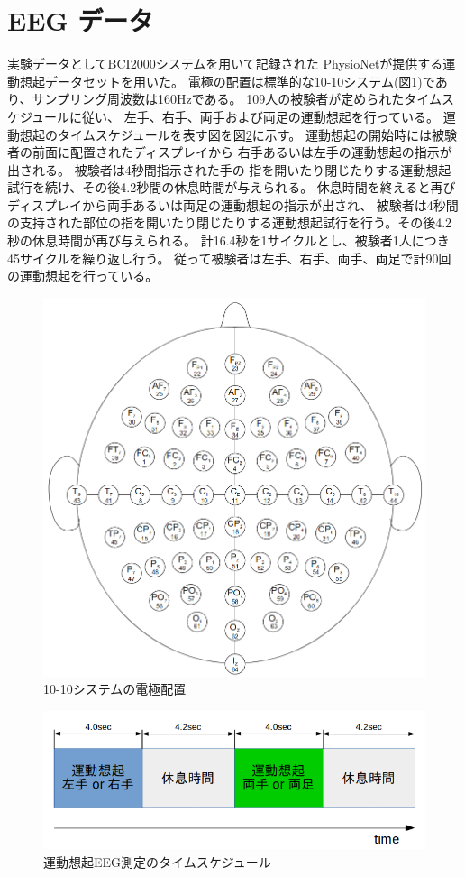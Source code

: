 \section{\rm EEG \mc データ}
実験データとしてBCI2000システムを用いて記録された
PhysioNetが提供する運動想起データセットを用いた。
電極の配置は標準的な10-10システム(図\ref{fig:10system})であり、サンプリング周波数は160Hzである。
109人の被験者が定められたタイムスケジュールに従い、
左手、右手、両手および両足の運動想起を行っている。
運動想起のタイムスケジュールを表す図を図\ref{fig:motorimage}に示す。
運動想起の開始時には被験者の前面に配置されたディスプレイから
右手あるいは左手の運動想起の指示が出される。
被験者は4秒間指示された手の
指を開いたり閉じたりする運動想起試行を続け、その後4.2秒間の休息時間が与えられる。
休息時間を終えると再びディスプレイから両手あるいは両足の運動想起の指示が出され、
被験者は4秒間の支持された部位の指を開いたり閉じたりする運動想起試行を行う。その後4.2秒の休息時間が再び与えられる。
計16.4秒を1サイクルとし、被験者1人につき45サイクルを繰り返し行う。
従って被験者は左手、右手、両手、両足で計90回の運動想起を行っている。
\begin{figure}[t]
    \centering
    \includegraphics[width=14cm]{images/system1010.png}
    \caption{10-10システムの電極配置}
    \label{fig:10system}
\end{figure}
\begin{figure}[t]
    \centering
    \includegraphics[width=12cm]{images/motorimage.png}
    \caption{運動想起EEG測定のタイムスケジュール}
    \label{fig:motorimage}
\end{figure}
